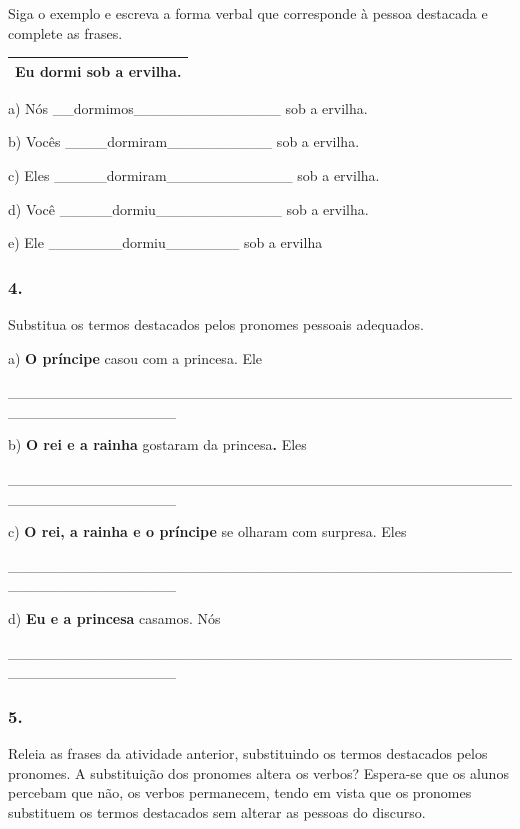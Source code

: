 Siga o exemplo e escreva a forma verbal que corresponde à pessoa
destacada e complete as frases.

\begin{longtable}[]{@{}l@{}}
\toprule
\textbf{Eu dormi} sob a ervilha.\tabularnewline
\bottomrule
\end{longtable}

a) Nós \_\_dormimos\_\_\_\_\_\_\_\_\_\_\_\_\_\_ sob a ervilha.

b) Vocês \_\_\_\_dormiram\_\_\_\_\_\_\_\_\_\_ sob a ervilha.

c) Eles \_\_\_\_\_dormiram\_\_\_\_\_\_\_\_\_\_\_\_ sob a ervilha.

d) Você \_\_\_\_\_dormiu\_\_\_\_\_\_\_\_\_\_\_\_ sob a ervilha.

e) Ele \_\_\_\_\_\_\_dormiu\_\_\_\_\_\_\_ sob a ervilha

\subsubsection{4. }\label{section-74}

Substitua os termos destacados pelos pronomes pessoais adequados.

a) \textbf{O príncipe} casou com a princesa. Ele

\_\_\_\_\_\_\_\_\_\_\_\_\_\_\_\_\_\_\_\_\_\_\_\_\_\_\_\_\_\_\_\_\_\_\_\_\_\_\_\_\_\_\_\_\_\_\_\_\_\_\_\_\_\_\_\_\_\_\_\_\_\_\_\_

b) \textbf{O rei e a rainha} gostaram da princesa\textbf{.} Eles

\_\_\_\_\_\_\_\_\_\_\_\_\_\_\_\_\_\_\_\_\_\_\_\_\_\_\_\_\_\_\_\_\_\_\_\_\_\_\_\_\_\_\_\_\_\_\_\_\_\_\_\_\_\_\_\_\_\_\_\_\_\_\_\_

c) \textbf{O rei, a rainha e o príncipe} se olharam com surpresa. Eles

\_\_\_\_\_\_\_\_\_\_\_\_\_\_\_\_\_\_\_\_\_\_\_\_\_\_\_\_\_\_\_\_\_\_\_\_\_\_\_\_\_\_\_\_\_\_\_\_\_\_\_\_\_\_\_\_\_\_\_\_\_\_\_\_

d) \textbf{Eu e a princesa} casamos. Nós

\_\_\_\_\_\_\_\_\_\_\_\_\_\_\_\_\_\_\_\_\_\_\_\_\_\_\_\_\_\_\_\_\_\_\_\_\_\_\_\_\_\_\_\_\_\_\_\_\_\_\_\_\_\_\_\_\_\_\_\_\_\_\_\_

\subsubsection{5. }\label{section-75}

Releia as frases da atividade anterior, substituindo os termos
destacados pelos pronomes. A substituição dos pronomes altera os verbos?
Espera-se que os alunos percebam que não, os verbos permanecem, tendo em
vista que os pronomes substituem os termos destacados sem alterar as
pessoas do discurso.

